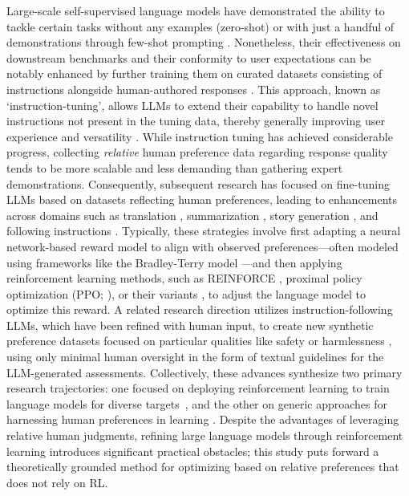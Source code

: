 Large-scale self-supervised language models have demonstrated the ability to tackle certain tasks without any examples (zero-shot) \citep{radford2019language} or with just a handful of demonstrations through few-shot prompting \citep{gpt3,megatron,chowdhery2022palm}. Nonetheless, their effectiveness on downstream benchmarks and their conformity to user expectations can be notably enhanced by further training them on curated datasets consisting of instructions alongside human-authored responses \citep{mishra-etal-2022-cross,sanh2022multitask,chung2022scaling,thoppilan2022lamda}. This approach, known as `instruction-tuning', allows LLMs to extend their capability to handle novel instructions not present in the tuning data, thereby generally improving user experience and versatility \citep{chung2022scaling}. While instruction tuning has achieved considerable progress, collecting \textit{relative} human preference data regarding response quality tends to be more scalable and less demanding than gathering expert demonstrations. Consequently, subsequent research has focused on fine-tuning LLMs based on datasets reflecting human preferences, leading to enhancements across domains such as translation \citep{kreutzer-etal-2018-reliability}, summarization \citep{stiennon2022learning,ziegler2020finetuning}, story generation \citep{ziegler2020finetuning}, and following instructions \citep{ouyang2022training,ramamurthy2023is}. Typically, these strategies involve first adapting a neural network-based reward model to align with observed preferences—often modeled using frameworks like the Bradley-Terry model \citep{bradley1952rankanalysis}—and then applying reinforcement learning methods, such as REINFORCE \citep{williams1992reinforce}, proximal policy optimization (PPO; \cite{schulman2017proximal}), or their variants \citep{ramamurthy2023is}, to adjust the language model to optimize this reward. A related research direction utilizes instruction-following LLMs, which have been refined with human input, to create new synthetic preference datasets focused on particular qualities like safety or harmlessness \citep{bai2022constitutional}, using only minimal human oversight in the form of textual guidelines for the LLM-generated assessments. Collectively, these advances synthesize two primary research trajectories: one focused on deploying reinforcement learning to train language models for diverse targets~\citep{Ranzato2015SequenceLT,paulus2018a,wu2018learning}, and the other on generic approaches for harnessing human preferences in learning \citep{christiano2017deep,kupcsik2018learning}. Despite the advantages of leveraging relative human judgments, refining large language models through reinforcement learning introduces significant practical obstacles; this study puts forward a theoretically grounded method for optimizing based on relative preferences that does not rely on RL.

